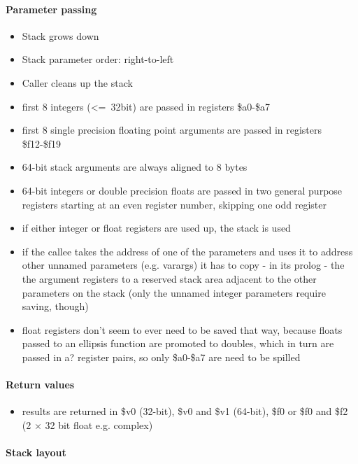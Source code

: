 \paragraph{Parameter passing}

\begin{itemize}
\item Stack grows down
\item Stack parameter order: right-to-left
\item Caller cleans up the stack
\item first 8 integers (\textless=\ 32bit) are passed in registers \$a0-\$a7
\item first 8 single precision floating point arguments are passed in registers \$f12-\$f19
\item 64-bit stack arguments are always aligned to 8 bytes
\item 64-bit integers or double precision floats are passed in two general purpose registers starting at an even register number, skipping one odd register
\item if either integer or float registers are used up, the stack is used
\item if the callee takes the address of one of the parameters and uses it to address other unnamed parameters (e.g. varargs) it has to copy - in its prolog - the the argument registers to a reserved stack area adjacent to the other parameters on the stack (only the unnamed integer parameters require saving, though) %
\item float registers don't seem to ever need to be saved that way, because floats passed to an ellipsis function are promoted to doubles, which in turn are passed in a? register pairs, so only \$a0-\$a7 are need to be spilled
\end{itemize}

\paragraph{Return values}

\begin{itemize}
\item results are returned in \$v0 (32-bit), \$v0 and \$v1 (64-bit), \$f0 or \$f0 and \$f2 (2 $\times$ 32 bit float e.g. complex)
\end{itemize}

\paragraph{Stack layout}

